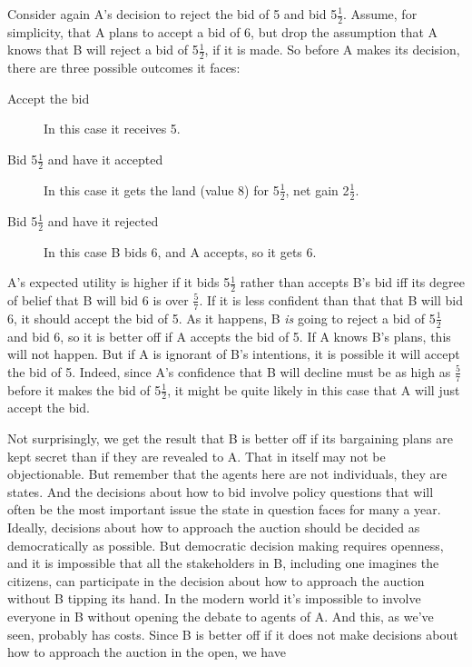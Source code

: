 Consider again A's decision to reject the bid of 5 and bid 5\(\frac{1}{2}\). Assume, for simplicity, that A plans to accept a bid of 6, but drop the assumption that A knows that B will reject a bid of 5\(\frac{1}{2}\), if it is made. So before A makes its decision, there are three possible outcomes it faces:

\begin{description}
\item[Accept the bid] In this case it receives 5.
\item[Bid 5\(\frac{1}{2}\) and have it accepted] In this case it gets the land (value 8) for 5\(\frac{1}{2}\), net gain 2\(\frac{1}{2}\).
\item[Bid 5\(\frac{1}{2}\) and have it rejected] In this case B bids 6, and A accepts, so it gets 6.
\end{description}

\noindent A's expected utility is higher if it bids 5\(\frac{1}{2}\) rather than accepts B's bid iff its degree of belief that B will bid 6 is over \(\frac{5}{7}\). If it is less confident than that that B will bid 6, it should accept the bid of 5. As it happens, B \textit{is} going to reject a bid of 5\(\frac{1}{2}\) and bid 6, so it is better off if A accepts the bid of 5. If A knows B's plans, this will not happen. But if A is ignorant of B's intentions, it is possible it will accept the bid of 5. Indeed, since A's confidence that B will decline must be as high as \(\frac{5}{7}\) before it makes the bid of 5\(\frac{1}{2}\), it might be quite likely in this case that A will just accept the bid.

Not surprisingly, we get the result that B is better off if its bargaining plans are kept secret than if they are revealed to A. That in itself may not be objectionable. But remember that the agents here are not individuals, they are states. And the decisions about how to bid involve policy questions that will often be the most important issue the state in question faces for many a year. Ideally, decisions about how to approach the auction should be decided as democratically as possible. But democratic decision making requires openness, and it is impossible that all the stakeholders in B, including one imagines the citizens, can participate in the decision about how to approach the auction without B tipping its hand. In the modern world it's impossible to involve everyone in B without opening the debate to agents of A. And this, as we've seen, probably has costs. Since B is better off if it does not make decisions about how to approach the auction in the open, we have

